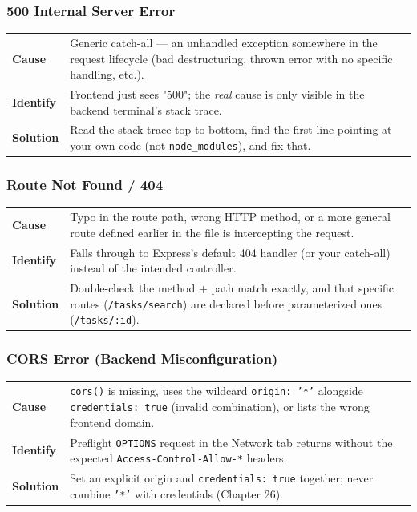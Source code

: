 \subsubsection*{500 Internal Server Error}
\noindent\begin{tabularx}{\textwidth}{@{}>{\bfseries}p{2.3cm}X@{}}
\toprule
Cause & Generic catch-all --- an unhandled exception somewhere in the
request lifecycle (bad destructuring, thrown error with no specific
handling, etc.). \\
Identify & Frontend just sees "500"; the \emph{real} cause is only visible
in the backend terminal's stack trace. \\
Solution & Read the stack trace top to bottom, find the first line
pointing at your own code (not \texttt{node\_modules}), and fix that. \\
\bottomrule
\end{tabularx}

\subsubsection*{Route Not Found / 404}
\noindent\begin{tabularx}{\textwidth}{@{}>{\bfseries}p{2.3cm}X@{}}
\toprule
Cause & Typo in the route path, wrong HTTP method, or a more general
route defined earlier in the file is intercepting the request. \\
Identify & Falls through to Express's default 404 handler (or your
catch-all) instead of the intended controller. \\
Solution & Double-check the method + path match exactly, and that
specific routes (\texttt{/tasks/search}) are declared before parameterized
ones (\texttt{/tasks/:id}). \\
\bottomrule
\end{tabularx}

\subsubsection*{CORS Error (Backend Misconfiguration)}
\noindent\begin{tabularx}{\textwidth}{@{}>{\bfseries}p{2.3cm}X@{}}
\toprule
Cause & \texttt{cors()} is missing, uses the wildcard \texttt{origin: '*'}
alongside \texttt{credentials: true} (invalid combination), or lists the
wrong frontend domain. \\
Identify & Preflight \texttt{OPTIONS} request in the Network tab returns
without the expected \texttt{Access-Control-Allow-*} headers. \\
Solution & Set an explicit origin and \texttt{credentials: true} together;
never combine \texttt{'*'} with credentials (Chapter 26). \\
\bottomrule
\end{tabularx}
